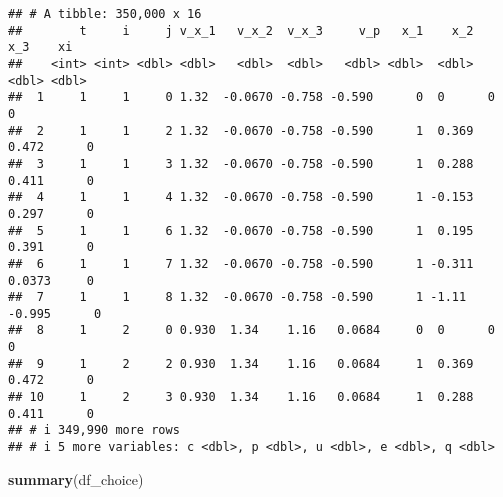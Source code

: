 \documentclass[
]{book}
\newenvironment{Shaded}{\begin{snugshade}}{\end{snugshade}}
\newcommand{\FunctionTok}[1]{\textcolor[rgb]{0.13,0.29,0.53}{\textbf{#1}}}
\newcommand{\NormalTok}[1]{#1}
\begin{document}
\begin{verbatim}
## # A tibble: 350,000 x 16
##        t     i     j v_x_1   v_x_2  v_x_3     v_p   x_1    x_2     x_3    xi
##    <int> <int> <dbl> <dbl>   <dbl>  <dbl>   <dbl> <dbl>  <dbl>   <dbl> <dbl>
##  1     1     1     0 1.32  -0.0670 -0.758 -0.590      0  0      0          0
##  2     1     1     2 1.32  -0.0670 -0.758 -0.590      1  0.369  0.472      0
##  3     1     1     3 1.32  -0.0670 -0.758 -0.590      1  0.288  0.411      0
##  4     1     1     4 1.32  -0.0670 -0.758 -0.590      1 -0.153  0.297      0
##  5     1     1     6 1.32  -0.0670 -0.758 -0.590      1  0.195  0.391      0
##  6     1     1     7 1.32  -0.0670 -0.758 -0.590      1 -0.311  0.0373     0
##  7     1     1     8 1.32  -0.0670 -0.758 -0.590      1 -1.11  -0.995      0
##  8     1     2     0 0.930  1.34    1.16   0.0684     0  0      0          0
##  9     1     2     2 0.930  1.34    1.16   0.0684     1  0.369  0.472      0
## 10     1     2     3 0.930  1.34    1.16   0.0684     1  0.288  0.411      0
## # i 349,990 more rows
## # i 5 more variables: c <dbl>, p <dbl>, u <dbl>, e <dbl>, q <dbl>
\end{verbatim}

\begin{Shaded}
\begin{Highlighting}[]
\FunctionTok{summary}\NormalTok{(df\_choice)}
\end{Highlighting}
\end{Shaded}
\end{document}
